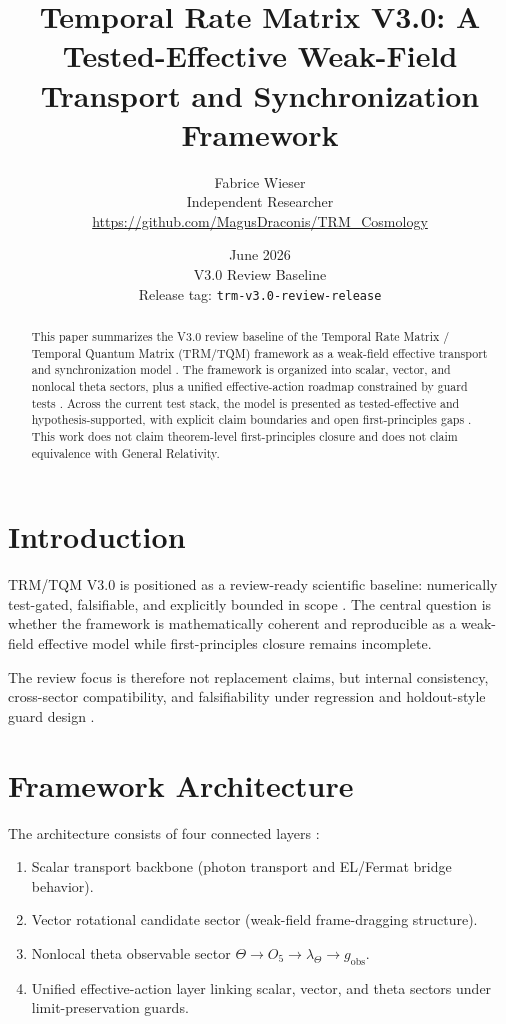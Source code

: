 \documentclass[11pt,a4paper]{article}
\title{Temporal Rate Matrix V3.0: A Tested-Effective Weak-Field Transport and Synchronization Framework}
\author{
Fabrice Wieser\\
Independent Researcher\\
\url{https://github.com/MagusDraconis/TRM_Cosmology}
}
\date{June 2026\\
V3.0 Review Baseline\\
Release tag: \texttt{trm-v3.0-review-release}}
\begin{document}
\maketitle

\begin{abstract}
This paper summarizes the V3.0 review baseline of the Temporal Rate Matrix / Temporal Quantum Matrix (TRM/TQM) framework as a weak-field effective transport and synchronization model \cite{trm_status_v3,field_sector_map}. The framework is organized into scalar, vector, and nonlocal theta sectors, plus a unified effective-action roadmap constrained by guard tests \cite{unified_action_roadmap}. Across the current test stack, the model is presented as tested-effective and hypothesis-supported, with explicit claim boundaries and open first-principles gaps \cite{gap_list,real_physics_coverage}. This work does not claim theorem-level first-principles closure and does not claim equivalence with General Relativity.
\end{abstract}

\section{Introduction}

TRM/TQM V3.0 is positioned as a review-ready scientific baseline: numerically test-gated, falsifiable, and explicitly bounded in scope \cite{trm_status_v3}. The central question is whether the framework is mathematically coherent and reproducible as a weak-field effective model while first-principles closure remains incomplete.

The review focus is therefore not replacement claims, but internal consistency, cross-sector compatibility, and falsifiability under regression and holdout-style guard design \cite{real_physics_coverage}.

\section{Framework Architecture}

The architecture consists of four connected layers \cite{field_sector_map}:

\begin{enumerate}
  \item Scalar transport backbone (photon transport and EL/Fermat bridge behavior).
  \item Vector rotational candidate sector (weak-field frame-dragging structure).
  \item Nonlocal theta observable sector \(\Theta \rightarrow O_5 \rightarrow \lambda_\Theta \rightarrow g_{\mathrm{obs}}\).
  \item Unified effective-action layer linking scalar, vector, and theta sectors under limit-preservation guards.
\end{enumerate}
\end{document}
